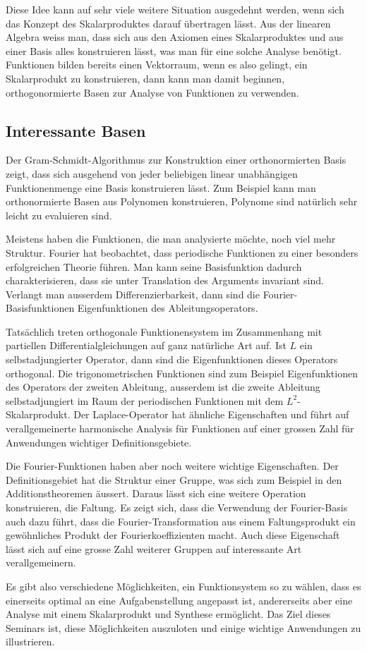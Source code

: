 Diese Idee kann auf sehr viele weitere Situation ausgedehnt werden,
wenn sich das Konzept des Skalarproduktes darauf übertragen lässt.
Aus der linearen Algebra weiss man, dass sich aus den Axiomen eines 
Skalarproduktes und aus einer Basis alles konstruieren lässt, was
man für eine solche Analyse benötigt.
Funktionen bilden bereits einen Vektorraum, wenn es also gelingt,
ein Skalarprodukt zu konstruieren, dann kann man damit beginnen,
orthogonormierte Basen zur Analyse von Funktionen zu verwenden.

%
%
\subsection{Interessante Basen}
Der Gram-Schmidt-Algorithmus zur Konstruktion einer orthonormierten
Basis zeigt, dass sich ausgehend von jeder beliebigen linear
unabhängigen Funktionenmenge eine Basis konstruieren lässt.
Zum Beispiel kann man orthonormierte Basen aus Polynomen konstruieren,
Polynome sind natürlich sehr leicht zu evaluieren sind.

Meistens haben die Funktionen, die man analysierte möchte, noch
viel mehr Struktur.
Fourier hat beobachtet, dass periodische Funktionen zu einer
besonders erfolgreichen Theorie führen.
Man kann seine Basisfunktion dadurch charakterisieren, dass sie
unter Translation des Arguments invariant sind.
Verlangt man ausserdem Differenzierbarkeit, dann sind die
Fourier-Basisfunktionen Eigenfunktionen des Ableitungsoperators.

Tatsächlich treten orthogonale Funktionensystem im Zusammenhang
mit partiellen Differentialgleichungen auf ganz natürliche Art auf.
Ist $L$ ein selbstadjungierter Operator, dann sind die Eigenfunktionen
dieses Operators orthogonal.
Die trigonometrischen Funktionen sind zum Beispiel Eigenfunktionen
des Operators der zweiten Ableitung, ausserdem ist die zweite
Ableitung selbstadjungiert im Raum der periodischen Funktionen
mit dem $L^2$-Skalarprodukt.
Der Laplace-Operator hat ähnliche Eigenschaften und führt
auf verallgemeinerte harmonische Analysis für Funktionen auf
einer grossen Zahl für Anwendungen wichtiger Definitionsgebiete.

Die Fourier-Funktionen haben aber noch weitere wichtige Eigenschaften.
Der Definitionsgebiet hat die Struktur einer Gruppe, was sich zum
Beispiel in den Additionstheoremen äussert.
Daraus lässt sich eine weitere Operation konstruieren, die Faltung.
Es zeigt sich, dass die Verwendung der Fourier-Basis auch dazu führt,
dass die Fourier-Transformation aus einem Faltungsprodukt ein gewöhnliches
Produkt der Fourierkoeffizienten macht.
Auch diese Eigenschaft lässt sich auf eine grosse Zahl weiterer
Gruppen auf interessante Art verallgemeinern.

Es gibt also verschiedene Möglichkeiten, ein Funktionsystem so
zu wählen, dass es einerseits optimal an eine Aufgabenstellung
angepasst ist, andererseits aber eine Analyse mit einem Skalarprodukt
und Synthese ermöglicht.
Das Ziel dieses Seminars ist, diese Möglichkeiten auszuloten
und einige wichtige Anwendungen zu illustrieren.




